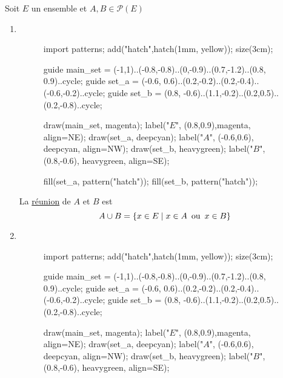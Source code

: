 \begin{defn}
	Soit $E$ un ensemble et $A, B \in \mathcal{P}(E)$
	\begin{enumerate}
		\item ~\\
			\begin{minipage}
				{\linewidth}
				\begin{wrapfigure}{r}{3cm}
					\centering
					\vspace{-7mm}
					\begin{asy}
						import patterns;
						add("hatch",hatch(1mm, yellow));
						size(3cm);

						guide main_set = (-1,1)..(-0.8,-0.8)..(0,-0.9)..(0.7,-1.2)..(0.8, 0.9)..cycle;
						guide set_a = (-0.6, 0.6)..(0.2,-0.2)..(0.2,-0.4)..(-0.6,-0.2)..cycle;
						guide set_b = (0.8, -0.6)..(1.1,-0.2)..(0.2,0.5)..(0.2,-0.8)..cycle;

						draw(main_set, magenta); label("$E$", (0.8,0.9),magenta, align=NE);
						draw(set_a, deepcyan); label("$A$", (-0.6,0.6), deepcyan, align=NW);
						draw(set_b, heavygreen); label("$B$", (0.8,-0.6), heavygreen, align=SE);

						fill(set_a, pattern("hatch"));
						fill(set_b, pattern("hatch"));
					\end{asy}
				\end{wrapfigure}
				La \underline{réunion} de $A$ et $B$ est \[
					A \cup B = \{x \in E  \mid x \in A \operatorname{\text{ ou }} x \in B\}
				\]
				\index{réunion (ensemble)}
			\end{minipage}
			\vspace{2cm}
		\item ~\\
			\begin{minipage}
				{\linewidth}
				\begin{wrapfigure}{r}{3cm}
					\centering
					\vspace{-7mm}
					\begin{asy}
						import patterns;
						add("hatch",hatch(1mm, yellow));
						size(3cm);

						guide main_set = (-1,1)..(-0.8,-0.8)..(0,-0.9)..(0.7,-1.2)..(0.8, 0.9)..cycle;
						guide set_a = (-0.6, 0.6)..(0.2,-0.2)..(0.2,-0.4)..(-0.6,-0.2)..cycle;
						guide set_b = (0.8, -0.6)..(1.1,-0.2)..(0.2,0.5)..(0.2,-0.8)..cycle;

						draw(main_set, magenta); label("$E$", (0.8,0.9),magenta, align=NE);
						draw(set_a, deepcyan); label("$A$", (-0.6,0.6), deepcyan, align=NW);
						draw(set_b, heavygreen); label("$B$", (0.8,-0.6), heavygreen, align=SE);


\end{asy}
\end{wrapfigure}
\end{minipage}
\end{enumerate}
\end{defn}
